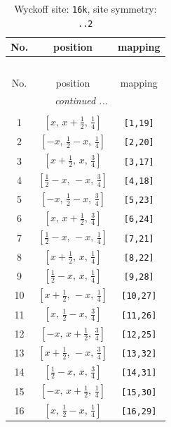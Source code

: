 \documentclass[fleqn,8pt]{jsarticle}
\begin{document}
\begin{longtable}{ccc}
\caption{Wyckoff site: {\tt 16k}, site symmetry: {\tt ..2}}
 \\
 \hline \hline
No. & position & mapping \\ \hline \endfirsthead

\multicolumn{2}{l}{\tablename\ \thetable{}} \\
 \hline \hline
No. & position & mapping \\ \hline \endhead

 \hline \hline
\multicolumn{2}{r}{\footnotesize\it continued ...} \\ \endfoot

 \hline \hline
\multicolumn{2}{r}{} \\ \endlastfoot

1 & $\left[ x,\, x + \frac{1}{2},\, \frac{1}{4} \right]$ & {\tt [1,19]} \\ \hline
2 & $\left[ - x,\, \frac{1}{2} - x,\, \frac{1}{4} \right]$ & {\tt [2,20]} \\ \hline
3 & $\left[ x + \frac{1}{2},\, x,\, \frac{3}{4} \right]$ & {\tt [3,17]} \\ \hline
4 & $\left[ \frac{1}{2} - x,\, - x,\, \frac{3}{4} \right]$ & {\tt [4,18]} \\ \hline
5 & $\left[ - x,\, \frac{1}{2} - x,\, \frac{3}{4} \right]$ & {\tt [5,23]} \\ \hline
6 & $\left[ x,\, x + \frac{1}{2},\, \frac{3}{4} \right]$ & {\tt [6,24]} \\ \hline
7 & $\left[ \frac{1}{2} - x,\, - x,\, \frac{1}{4} \right]$ & {\tt [7,21]} \\ \hline
8 & $\left[ x + \frac{1}{2},\, x,\, \frac{1}{4} \right]$ & {\tt [8,22]} \\ \hline
9 & $\left[ \frac{1}{2} - x,\, x,\, \frac{1}{4} \right]$ & {\tt [9,28]} \\ \hline
10 & $\left[ x + \frac{1}{2},\, - x,\, \frac{1}{4} \right]$ & {\tt [10,27]} \\ \hline
11 & $\left[ x,\, \frac{1}{2} - x,\, \frac{3}{4} \right]$ & {\tt [11,26]} \\ \hline
12 & $\left[ - x,\, x + \frac{1}{2},\, \frac{3}{4} \right]$ & {\tt [12,25]} \\ \hline
13 & $\left[ x + \frac{1}{2},\, - x,\, \frac{3}{4} \right]$ & {\tt [13,32]} \\ \hline
14 & $\left[ \frac{1}{2} - x,\, x,\, \frac{3}{4} \right]$ & {\tt [14,31]} \\ \hline
15 & $\left[ - x,\, x + \frac{1}{2},\, \frac{1}{4} \right]$ & {\tt [15,30]} \\ \hline
16 & $\left[ x,\, \frac{1}{2} - x,\, \frac{1}{4} \right]$ & {\tt [16,29]} \\
\end{longtable}
\end{document}
